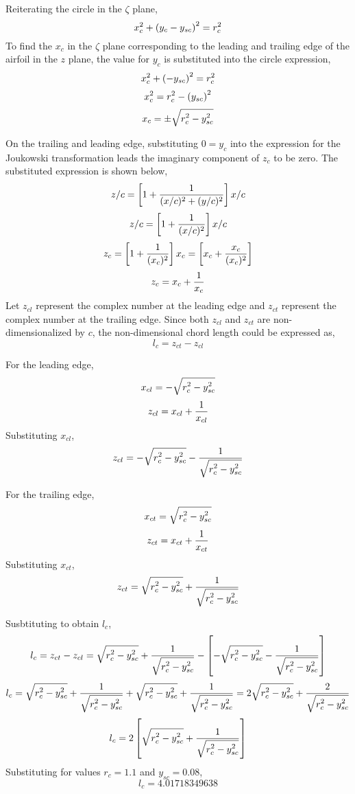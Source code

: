 \documentclass[class=report, 12pt, crop=false]{standalone}
\begin{document}
\begin{center}
Reiterating the circle in the $\zeta$ plane,
$$x_c^2 + \left(y_c-y_{sc}\right)^2 = r_c^2$$
To find the $x_c$ in the $\zeta$ plane corresponding to the leading and trailing edge of the airfoil in the $z$ plane, the value for $y_c$ is substituted into the circle expression,
$$x_c^2 + \left(-y_{sc}\right)^2 = r_c^2$$
$$x_c^2 = r_c^2 - \left(y_{sc}\right)^2$$
$$x_c = \pm\sqrt{\displaystyle{r_c^2 - y_{sc}^2}}$$

On the trailing and leading edge, substituting $0 = y_c$ into the expression for the Joukowski transformation leads the imaginary component of $z_c$ to be zero. The substituted expression is shown below,
$$z/c = \left[1+\frac{1}{(x/c)^2+(y/c)^2}\right]x/c$$
$$z/c = \left[1+\frac{1}{(x/c)^2}\right]x/c$$
$$z_c = \left[1+\frac{1}{(x_c)^2}\right]x_c = \left[x_c+\frac{x_c}{(x_c)^2}\right]$$
$$z_c = x_c+\frac{1}{x_c}$$
Let $z_{cl}$ represent the complex number at the leading edge and $z_{ct}$ represent the complex number at the trailing edge. Since both $z_{cl}$ and $z_{ct}$ are non-dimensionalized by $c$, the non-dimensional chord length could be expressed as,
$$l_c = z_{ct} - z_{cl}$$

For the leading edge,
$$x_{cl} = -\sqrt{\displaystyle{r_c^2 - y_{sc}^2}}$$
$$z_{cl} = x_{cl}+\frac{1}{x_{cl}}$$
Substituting $x_{cl}$,
$$z_{cl} = -\sqrt{\displaystyle{r_c^2 - y_{sc}^2}}-\frac{1}{\sqrt{\displaystyle{r_c^2 - y_{sc}^2}}}$$

For the trailing edge,
$$x_{ct} = \sqrt{\displaystyle{r_c^2 - y_{sc}^2}}$$
$$z_{ct} = x_{ct}+\frac{1}{x_{ct}}$$
Substituting $x_{ct}$,
$$z_{ct} = \sqrt{\displaystyle{r_c^2 - y_{sc}^2}}+\frac{1}{\sqrt{\displaystyle{r_c^2 - y_{sc}^2}}}$$

Susbtituting to obtain $l_c$,
$$l_c = z_{ct} - z_{cl} = \sqrt{\displaystyle{r_c^2 - y_{sc}^2}}+\frac{1}{\sqrt{\displaystyle{r_c^2 - y_{sc}^2}}}-\left[-\sqrt{\displaystyle{r_c^2 - y_{sc}^2}}-\frac{1}{\sqrt{\displaystyle{r_c^2 - y_{sc}^2}}}\right]$$
$$l_c = \sqrt{\displaystyle{r_c^2 - y_{sc}^2}}+\frac{1}{\sqrt{\displaystyle{r_c^2 - y_{sc}^2}}} + \sqrt{\displaystyle{r_c^2 - y_{sc}^2}} + \frac{1}{\sqrt{\displaystyle{r_c^2 - y_{sc}^2}}} = 2\sqrt{\displaystyle{r_c^2 - y_{sc}^2}} + \frac{2}{\sqrt{\displaystyle{r_c^2 - y_{sc}^2}}}$$
$$l_c = 2\left[\sqrt{\displaystyle{r_c^2 - y_{sc}^2}} + \frac{1}{\sqrt{\displaystyle{r_c^2 - y_{sc}^2}}}\right]$$
Substituting for values $r_c = 1.1$ and $y_{sc} = 0.08$,
$$l_c = 4.01718349638$$

\end{center}
\end{document}
